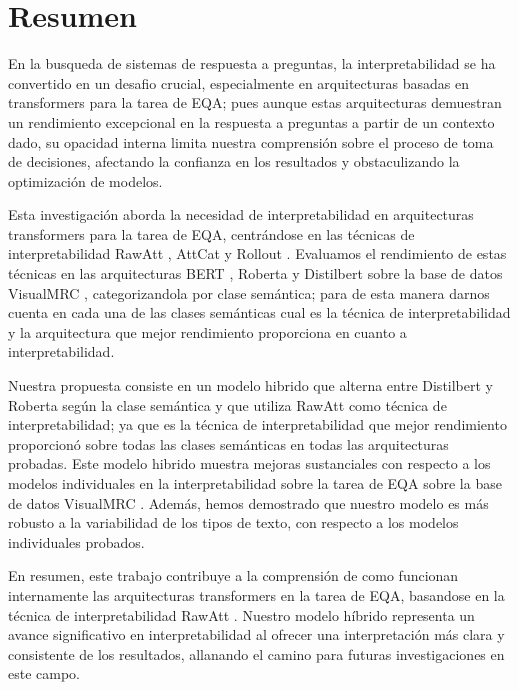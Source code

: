 \newpage
\chapter*{\sffamily Resumen}
%
\par En la busqueda de sistemas de respuesta a preguntas, la interpretabilidad se ha convertido en un desafio crucial, especialmente en arquitecturas basadas en transformers para la tarea de EQA; pues aunque estas arquitecturas demuestran un rendimiento excepcional en la respuesta a preguntas a partir de un contexto dado, su opacidad interna limita nuestra comprensión sobre el proceso de toma de decisiones, afectando la confianza en los resultados y obstaculizando la optimización de modelos.

Esta investigación aborda la necesidad de interpretabilidad en arquitecturas transformers para la tarea de  EQA, centrándose en las técnicas de interpretabilidad RawAtt \cite{abnar2020quantifying}, AttCat \cite{qiang2022attcat} y Rollout \cite{abnar2020quantifying}. Evaluamos el rendimiento de estas técnicas en las arquitecturas BERT \cite{devlin2018bert}, Roberta \cite{liu2019roberta} y Distilbert \cite{sanh2019distilbert} sobre la base de datos VisualMRC \cite{tanaka2021visualmrc}, categorizandola por clase semántica; para de esta manera darnos cuenta en cada una de las clases semánticas cual es la técnica de interpretabilidad y la arquitectura que mejor rendimiento proporciona en cuanto a interpretabilidad.


Nuestra propuesta consiste en un modelo hibrido que alterna entre Distilbert \cite{sanh2019distilbert} y Roberta \cite{liu2019roberta} según la clase semántica y que utiliza RawAtt \cite{abnar2020quantifying} como técnica de interpretabilidad; ya que es la técnica de interpretabilidad que mejor rendimiento proporcionó sobre todas las clases semánticas en todas las arquitecturas probadas. Este modelo hibrido muestra mejoras sustanciales con respecto a los modelos individuales en la interpretabilidad sobre la tarea de EQA sobre la base de datos VisualMRC \cite{tanaka2021visualmrc}. Además, hemos demostrado que nuestro modelo es más robusto a la variabilidad de los tipos de texto, con respecto a los modelos individuales probados.


En resumen, este trabajo contribuye a la comprensión de como funcionan internamente las arquitecturas transformers en la tarea de EQA, basandose en la técnica de interpretabilidad RawAtt \cite{abnar2020quantifying}. Nuestro modelo híbrido representa un avance significativo en interpretabilidad al ofrecer una interpretación más clara y consistente de los resultados, allanando el camino para futuras investigaciones en este campo.

